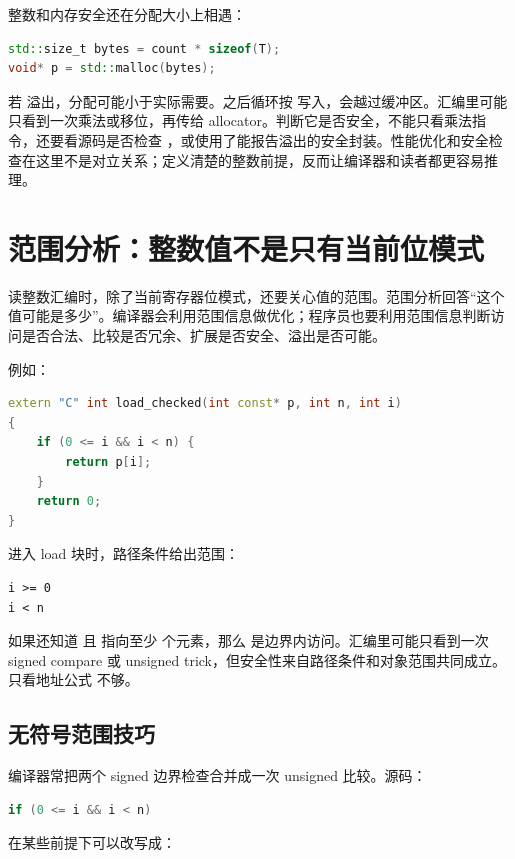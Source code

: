 整数和内存安全还在分配大小上相遇：

\begin{lstlisting}[language=C++]
std::size_t bytes = count * sizeof(T);
void* p = std::malloc(bytes);
\end{lstlisting}

若  溢出，分配可能小于实际需要。之后循环按  写入，会越过缓冲区。汇编里可能只看到一次乘法或移位，再传给 allocator。判断它是否安全，不能只看乘法指令，还要看源码是否检查 ，或使用了能报告溢出的安全封装。性能优化和安全检查在这里不是对立关系；定义清楚的整数前提，反而让编译器和读者都更容易推理。

\section{范围分析：整数值不是只有当前位模式}

读整数汇编时，除了当前寄存器位模式，还要关心值的范围。范围分析回答“这个值可能是多少”。编译器会利用范围信息做优化；程序员也要利用范围信息判断访问是否合法、比较是否冗余、扩展是否安全、溢出是否可能。

例如：

\begin{lstlisting}[language=C++]
extern "C" int load_checked(int const* p, int n, int i)
{
    if (0 <= i && i < n) {
        return p[i];
    }
    return 0;
}
\end{lstlisting}

进入 load 块时，路径条件给出范围：

\begin{lstlisting}
i >= 0
i < n
\end{lstlisting}

如果还知道  且  指向至少  个元素，那么  是边界内访问。汇编里可能只看到一次 signed compare 或 unsigned trick，但安全性来自路径条件和对象范围共同成立。只看地址公式  不够。

\subsection{无符号范围技巧}

编译器常把两个 signed 边界检查合并成一次 unsigned 比较。源码：

\begin{lstlisting}[language=C++]
if (0 <= i && i < n)
\end{lstlisting}

在某些前提下可以改写成：

